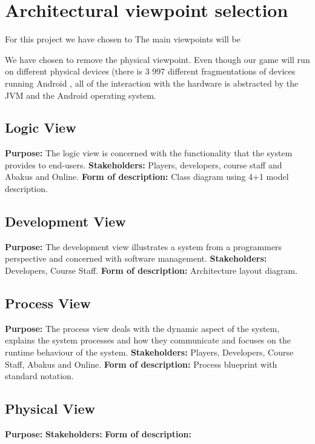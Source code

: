\section{Architectural viewpoint selection} 
\label{architecturalviewpointselection}

For this project we have chosen to %
The main viewpoints will be %

We have chosen to remove the physical viewpoint. Even though our game will run on different physical devices (there is 3 997 different fragmentations of devices running Android %
, all of the interaction with the hardware is abstracted by the JVM and the Android operating system.

\subsection{Logic View}
{\bf Purpose: } The logic view is concerned with the functionality that the system provides to end-users.
{\bf Stakeholders: } Players, developers, course staff and Abakus and Online.
{\bf Form of description: } Class diagram using 4+1 model description.

\subsection{Development View}
{\bf Purpose: } The development view illustrates a system from a programmers perspective and concerned with software management.
{\bf Stakeholders: } Developers, Course Staff.
{\bf Form of description: } Architecture layout diagram.

\subsection{Process View}
{\bf Purpose: } The process view deals with the dynamic aspect of the system, explains the system processes and how they communicate and focuses on the runtime behaviour of the system.
{\bf Stakeholders: } Players, Developers, Course Staff, Abakus and Online.
{\bf Form of description: } Process blueprint with standard notation.

\subsection{Physical View}
{\bf Purpose: }
{\bf Stakeholders: }
{\bf Form of description: }
